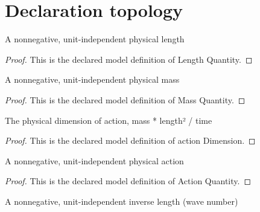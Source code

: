 \section{Declaration topology}
\begin{definition}
  \label{def:physics:phyx-mini-0521:phyxminiproblems-problemphyxmini0521-lengthquantity}
  A nonnegative, unit-independent physical length
\end{definition}
\begin{proof}
  This is the declared model definition of Length Quantity.
\end{proof}
\begin{definition}
  \label{def:physics:phyx-mini-0521:phyxminiproblems-problemphyxmini0521-massquantity}
  A nonnegative, unit-independent physical mass
\end{definition}
\begin{proof}
  This is the declared model definition of Mass Quantity.
\end{proof}
\begin{definition}
  \label{def:physics:phyx-mini-0521:phyxminiproblems-problemphyxmini0521-actiondimension}
  The physical dimension of action, mass * length² / time
\end{definition}
\begin{proof}
  This is the declared model definition of action Dimension.
\end{proof}
\begin{definition}
  \label{def:physics:phyx-mini-0521:phyxminiproblems-problemphyxmini0521-actionquantity}
  A nonnegative, unit-independent physical action
\end{definition}
\begin{proof}
  This is the declared model definition of Action Quantity.
\end{proof}
\begin{definition}
  \label{def:physics:phyx-mini-0521:phyxminiproblems-problemphyxmini0521-wavenumberquantity}
  A nonnegative, unit-independent inverse length (wave number)
\end{definition}
